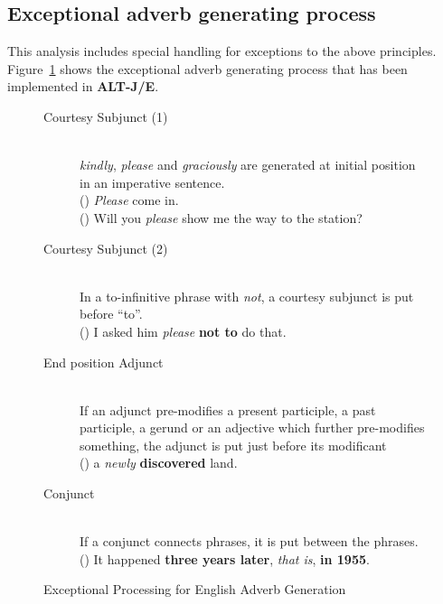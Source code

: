 \subsection{Exceptional adverb generating process}

This analysis includes special handling for exceptions to the above
principles.  Figure~\ref{fig:exception} shows the exceptional adverb
generating process that has been implemented in {\bf ALT-J/E}.

\begin{singlespace}
\begin{figure}[b]
    \leavevmode
    \small    
 \begin{description}
  \item [Courtesy Subjunct (1)] \mbox{} \\
        {\em kindly}, {\em please} and {\em graciously} are generated 
        at initial position in an imperative sentence. \\
        ()
        {\em Please} come in. \\
        ()
        Will you {\em please} show me the way to the station?
  \item [Courtesy Subjunct (2)] \mbox{}\\
        In a to-infinitive phrase with {\em not}, 
        a courtesy subjunct is put before ``to''. \\
        ()
        I asked him {\em please} {\bf not to} do that.
  \item [End position Adjunct] \mbox{} \\
        If an adjunct pre-modifies 
        a present participle, a past participle, 
        a gerund or an adjective 
        which further pre-modifies something, 
        the adjunct is put just before its modificant\\
        ()
        a {\em newly} {\bf discovered} land.
  \item [Conjunct] \mbox{} \\
        If a conjunct connects phrases, it is put between the phrases. \\
        ()
        It happened {\bf three years later}, {\em that is}, {\bf in 1955}.
 \end{description}
    \caption{Exceptional Processing for English Adverb Generation}
    \label{fig:exception}
\end{figure}
\end{singlespace}

